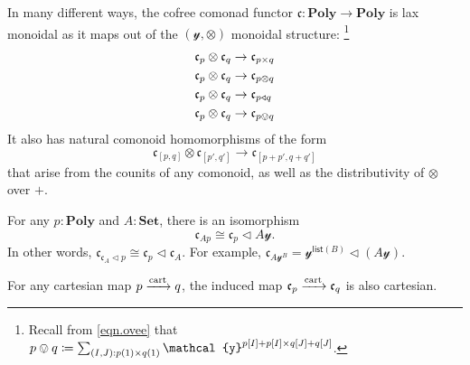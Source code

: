 \documentclass[11pt, one side, article]{memoir}
\theoremstyle{definition}
\theoremstyle{plain}
\newcommand{\Cat}[1]{\mathbf{#1}}%
\newcommand{\Fun}[1]{\mathsf{#1}}%
\newcommand{\To}[2][]{\xrightarrow[#1]{\tn{$#2$}}}
\newcommand{\tn}[1]{\textnormal{#1}}
\newcommand{\smset}{\Cat{Set}}
\newcommand{\List}{\Fun{list}}
\newcommand{\yon}{{\mathcal{y}}}
\newcommand{\poly}{\Cat{Poly}}
\newcommand{\cart}{\tn{cart}}
\newcommand{\tocart}{\To{\cart}}
\newcommand{\0}{\textsf{0}}
\newcommand{\1}{\tn{\textsf{1}}}
\newcommand{\tri}{\mathbin{\triangleleft}}
\newcommand{\cofree}{\mathfrak{c}}
\newcommand{\uu}{\List}
\begin{document}
 
In many different ways, the cofree comonad functor $\cofree\colon\poly\to\poly$ is lax monoidal as it maps out of the $(\yon,\otimes)$ monoidal structure:%
\footnote{Recall from \eqref{eqn.ovee} that $p\ovee q\coloneqq \sum_{(I,J): p(1)\times q(1)}\yon^{p[I]+p[I]\times q[J]+q[J]}$.}
\begin{align}
  \cofree_p\otimes\cofree_q&\to\cofree_{p\times q}\\
  \label{cofree_lax_monoidal}
  \cofree_p\otimes\cofree_q&\to\cofree_{p\otimes q}\\
  \cofree_p\otimes\cofree_q&\to\cofree_{p\tri q}\\
	\cofree_p\otimes\cofree_q&\to\cofree_{p\ovee q}  
\end{align}
It also has natural comonoid homomorphisms of the form
\begin{equation}
	\cofree_{[p,q]}\otimes\cofree_{[p',q']}\to\cofree_{[p+p',q+q']}
\end{equation}
that arise from the counits of any comonoid, as well as the distributivity of $\otimes$ over $+$.


For any $p:\poly$ and $A:\smset$, there is an isomorphism
\begin{equation}
	\cofree_{Ap}
	\cong
	\cofree_p\tri A\yon.
\end{equation}
In other words, $\cofree_{\cofree_A\tri p}\cong\cofree_p\tri\cofree_A$. For example, $\cofree_{A\yon^B}=\yon^{\List(B)}\tri(A\yon)$.


For any cartesian map $p\tocart q$, the induced map $\cofree_p\tocart\cofree_q$ is also cartesian.

\end{document}
